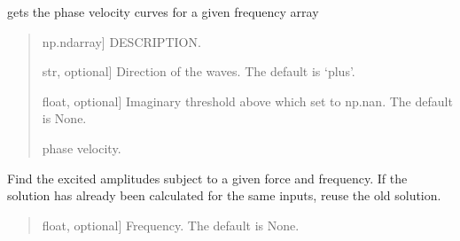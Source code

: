 \documentclass[letterpaper,10pt,english]{sphinxmanual}
\begin{document}
\begin{fulllineitems}
\begin{fulllineitems}
\label{\detokenize{model:pywfe.Model.phase_velocity}}
\pysigstartsignatures
{}
\pysigstopsignatures
\sphinxAtStartPar
gets the phase velocity curves for a given frequency array
\begin{quote}\begin{description}
\begin{description}
\sphinxlineitem{\sphinxstylestrong{frequency\_array}}{[}np.ndarray{]}
\sphinxAtStartPar
DESCRIPTION.

\sphinxlineitem{\sphinxstylestrong{direction}}{[}str, optional{]}
\sphinxAtStartPar
Direction of the waves. The default is ‘plus’.

\sphinxlineitem{\sphinxstylestrong{imag\_threshold}}{[}float, optional{]}
\sphinxAtStartPar
Imaginary threshold above which set to np.nan. The default is None.

\end{description}

\begin{description}
\sphinxAtStartPar
phase velocity.

\end{description}

\end{description}\end{quote}

\end{fulllineitems}


\begin{fulllineitems}
\label{\detokenize{model:pywfe.Model.excited_amplitudes}}
\pysigstartsignatures
{}
\pysigstopsignatures
\sphinxAtStartPar
Find the excited amplitudes subject to a given force and frequency.
If the solution has already been calculated for the same inputs,
reuse the old solution.
\begin{quote}\begin{description}
\begin{description}
\sphinxlineitem{\sphinxstylestrong{f}}{[}float, optional{]}
\sphinxAtStartPar
Frequency. The default is None.


\end{description}
\end{description}
\end{quote}
\end{fulllineitems}
\end{fulllineitems}
\end{document}
